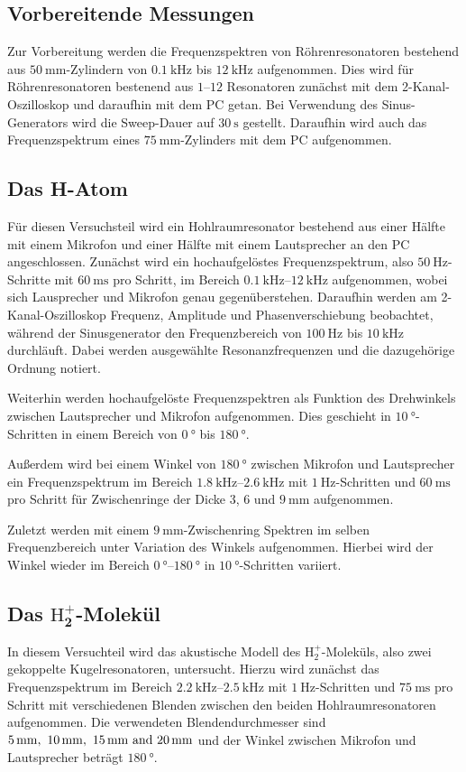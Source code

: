 \subsection{Vorbereitende Messungen}
Zur Vorbereitung werden die Frequenzspektren von Röhrenresonatoren bestehend aus $\SI{50}{\mm}$-Zylindern von $\SI{0.1}{\kilo\hertz}$ bis $\SI{12}{\kilo\hertz}$ aufgenommen. Dies wird für Röhrenresonatoren bestenend aus $1$--$12$ Resonatoren zunächst mit dem 2-Kanal-Oszilloskop und daraufhin mit dem PC getan. Bei Verwendung des Sinus-Generators wird die Sweep-Dauer auf $\SI{30}{\second}$ gestellt. Daraufhin wird auch das Frequenzspektrum eines $\SI{75}{\mm}$-Zylinders mit dem PC aufgenommen.

\subsection{Das H-Atom}
Für diesen Versuchsteil wird ein Hohlraumresonator bestehend aus einer Hälfte mit einem Mikrofon und einer Hälfte mit einem Lautsprecher an den PC angeschlossen. Zunächst wird ein hochaufgelöstes Frequenzspektrum, also $\SI{50}{\hertz}$-Schritte mit $\SI{60}{\milli\second}$ pro Schritt, im Bereich $\SIrange{0.1}{12}{\kilo\hertz}$ aufgenommen, wobei sich Lausprecher und Mikrofon genau gegenüberstehen. Daraufhin werden am 2-Kanal-Oszilloskop Frequenz, Amplitude und Phasenverschiebung beobachtet, während der Sinusgenerator den Frequenzbereich von $\SI{100}{\hertz}$ bis $\SI{10}{\kilo\hertz}$ durchläuft. Dabei werden ausgewählte Resonanzfrequenzen und die dazugehörige Ordnung notiert.

Weiterhin werden hochaufgelöste Frequenzspektren als Funktion des Drehwinkels zwischen Lautsprecher und Mikrofon aufgenommen. Dies geschieht in $\SI{10}{\degree}$-Schritten in einem Bereich von $\SI{0}{\degree}$ bis $\SI{180}{\degree}$.

Außerdem wird bei einem Winkel von $\SI{180}{\degree}$ zwischen Mikrofon und Lautsprecher ein Frequenzspektrum im Bereich $\SIrange{1.8}{2.6}{\kilo\hertz}$ mit $\SI{1}{\hertz}$-Schritten und $\SI{60}{\milli\second}$ pro Schritt für Zwischenringe der Dicke $\num{3}$, $\num{6}$ und $\SI{9}{\milli\metre}$ aufgenommen.

Zuletzt werden mit einem $\SI{9}{\milli\metre}$-Zwischenring Spektren im selben Frequenzbereich unter Variation des Winkels aufgenommen. Hierbei wird der Winkel wieder im Bereich $\SIrange{0}{180}{\degree}$ in $\SI{10}{\degree}$-Schritten variiert.

\subsection[Das $\mathrm{H}_2^{+}$-Molekül]{Das $\symbf{\mathrm{H}_2^{+}}$-Molekül}
In diesem Versuchteil wird das akustische Modell des $\mathrm{H}_2^+$-Moleküls, also zwei gekoppelte Kugelresonatoren, untersucht. Hierzu wird zunächst das Frequenzspektrum im Bereich $\SIrange{2.2}{2.5}{\kilo\hertz}$ mit $\SI{1}{\hertz}$-Schritten und $\SI{75}{\milli\second}$ pro Schritt mit verschiedenen Blenden zwischen den beiden Hohlraumresonatoren aufgenommen. Die verwendeten Blendendurchmesser sind $\SIlist{5;10;15;20}{\milli\metre}$ und der Winkel zwischen Mikrofon und Lautsprecher beträgt $\SI{180}{\degree}$.

